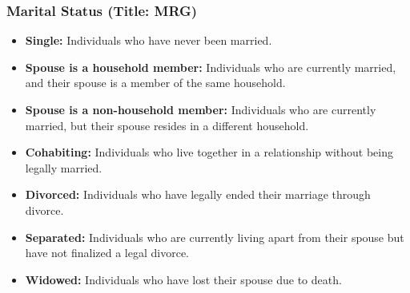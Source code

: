 \documentclass[twocolumn]{article}
\begin{document}
		\subsubsection{Marital Status (Title: MRG)}

\begin{itemize}
    \item \textbf{Single:} Individuals who have never been married.
    
    \item \textbf{Spouse is a household member:} Individuals who are currently married, and their spouse is a member of the same household.
    
    \item \textbf{Spouse is a non-household member:} Individuals who are currently married, but their spouse resides in a different household.
    
    \item \textbf{Cohabiting:} Individuals who live together in a relationship without being legally married.
    
    \item \textbf{Divorced:} Individuals who have legally ended their marriage through divorce.
    
    \item \textbf{Separated:} Individuals who are currently living apart from their spouse but have not finalized a legal divorce.
    
    \item \textbf{Widowed:} Individuals who have lost their spouse due to death.
\end{itemize}
\end{document}
